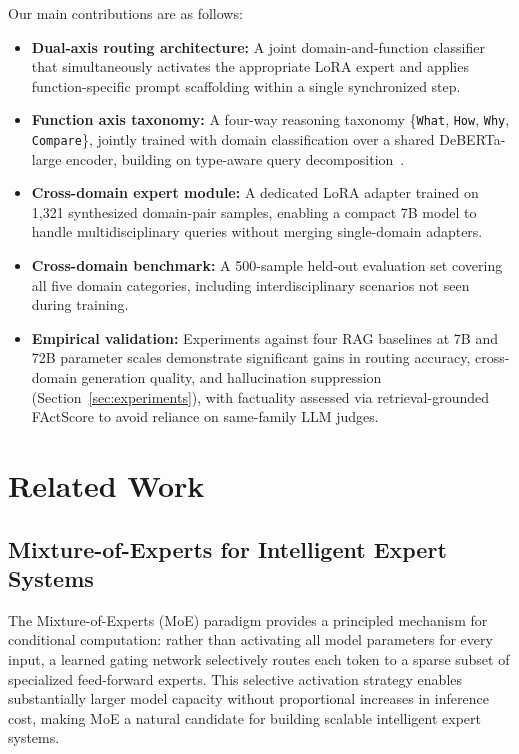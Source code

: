 \documentclass[a4paper,fleql]{cas-sc}
\begin{document}
Our main contributions are as follows:
\begin{itemize}
    \item \textbf{Dual-axis routing architecture:} A joint domain-and-function
    classifier that simultaneously activates the appropriate LoRA expert and
    applies function-specific prompt scaffolding within a single synchronized
    step.

    \item \textbf{Function axis taxonomy:} A four-way reasoning taxonomy
    \{\texttt{What}, \texttt{How}, \texttt{Why}, \texttt{Compare}\}, jointly
    trained with domain classification over a shared DeBERTa-large encoder,
    building on type-aware query decomposition~\citep{typedrag}.

    \item \textbf{Cross-domain expert module:} A dedicated LoRA adapter
    trained on 1,321 synthesized domain-pair samples, enabling a compact
    7B model to handle multidisciplinary queries without merging
    single-domain adapters.

    \item \textbf{Cross-domain benchmark:} A 500-sample held-out evaluation
    set covering all five domain categories, including interdisciplinary
    scenarios not seen during training.

    \item \textbf{Empirical validation:} Experiments against four RAG
    baselines at 7B and 72B parameter scales demonstrate significant gains
    in routing accuracy, cross-domain generation quality, and hallucination
    suppression (Section~\ref{sec:experiments}), with factuality assessed
    via retrieval-grounded FActScore to avoid reliance on same-family
    LLM judges.
\end{itemize}


\section{Related Work}
\label{sec:related}

\subsection{Mixture-of-Experts for Intelligent Expert Systems}
The Mixture-of-Experts (MoE) paradigm \citep{shazeer2017outrageously} provides
a principled mechanism for conditional computation: rather than activating all
model parameters for every input, a learned gating network selectively routes
each token to a sparse subset of specialized feed-forward experts. This
selective activation strategy enables substantially larger model capacity
without proportional increases in inference cost, making MoE a natural
candidate for building scalable intelligent expert systems.
\end{document}

